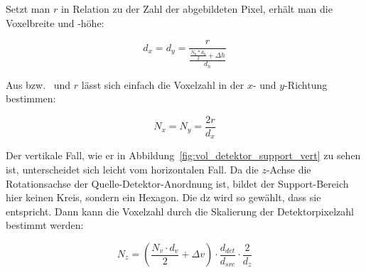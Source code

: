 Setzt man $r$ in Relation zu der Zahl der abgebildeten Pixel, erhält man die Voxelbreite und -höhe:

\begin{equation}
    d_x = d_y = \frac{r}{\frac{\frac{N_h * d_h}{2} + \Delta h}{d_h}}
\end{equation}

Aus  bzw.\  und $r$ lässt sich einfach die Voxelzahl in der $x$- und $y$-Richtung bestimmen:

\begin{equation}
    N_x = N_y = \frac{2r}{d_x}
\end{equation}

Der vertikale Fall, wie er in Abbildung~\ref{fig:vol_detektor_support_vert} zu sehen ist, unterscheidet sich leicht
vom horizontalen Fall. Da die $z$-Achse die Rotationsachse der Quelle-Detektor-Anordnung ist, bildet der Support-Bereich
hier keinen Kreis, sondern ein Hexagon. Die \gls{dz}  wird so gewählt, dass sie  entspricht.
Dann kann die Voxelzahl  durch die Skalierung der Detektorpixelzahl  bestimmt werden:

\begin{equation}
    N_z = \left(\frac{N_v \cdot d_v}{2} + \Delta v\right) \cdot \frac{d_{det}}{d_{src}} \cdot \frac{2}{d_z}
\end{equation}

